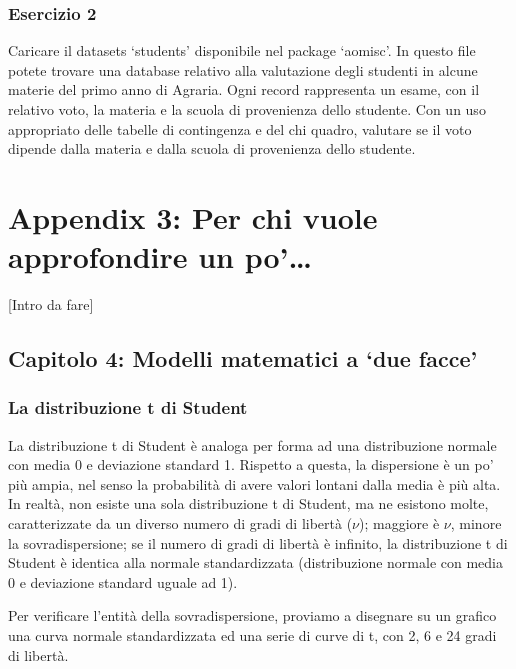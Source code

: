 \documentclass[a4paper,12pt,oneside]{book}
\theoremstyle{definition}
\theoremstyle{definition}
\theoremstyle{definition}
\theoremstyle{remark}
\begin{document}
\subsection*{Esercizio 2}\label{esercizio-2-1}

Caricare il datasets `students' disponibile nel package `aomisc'. In
questo file potete trovare una database relativo alla valutazione degli
studenti in alcune materie del primo anno di Agraria. Ogni record
rappresenta un esame, con il relativo voto, la materia e la scuola di
provenienza dello studente. Con un uso appropriato delle tabelle di
contingenza e del chi quadro, valutare se il voto dipende dalla materia
e dalla scuola di provenienza dello studente.

\chapter{Appendix 3: Per chi vuole approfondire un
po'\ldots{}}\label{appendix-3-per-chi-vuole-approfondire-un-po}

{[}Intro da fare{]}

\section{\texorpdfstring{Capitolo 4: Modelli matematici a `due
facce'}{Capitolo 4: Modelli matematici a due facce}}\label{capitolo-4-modelli-matematici-a-due-facce}

\subsection{La distribuzione t di
Student}\label{la-distribuzione-t-di-student}

La distribuzione t di Student è analoga per forma ad una distribuzione
normale con media 0 e deviazione standard 1. Rispetto a questa, la
dispersione è un po' più ampia, nel senso la probabilità di avere valori
lontani dalla media è più alta. In realtà, non esiste una sola
distribuzione t di Student, ma ne esistono molte, caratterizzate da un
diverso numero di gradi di libertà (\(\nu\)); maggiore è \(\nu\), minore
la sovradispersione; se il numero di gradi di libertà è infinito, la
distribuzione t di Student è identica alla normale standardizzata
(distribuzione normale con media 0 e deviazione standard uguale ad 1).

Per verificare l'entità della sovradispersione, proviamo a disegnare su
un grafico una curva normale standardizzata ed una serie di curve di t,
con 2, 6 e 24 gradi di libertà.
\end{document}
